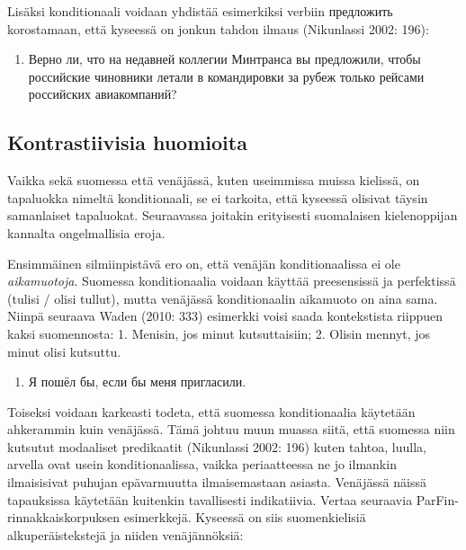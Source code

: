 \documentclass[]{scrreprt}
\providecommand{\tightlist}{%
  \setlength{\itemsep}{0pt}\setlength{\parskip}{0pt}}
\begin{document}
Lisäksi konditionaali voidaan yhdistää esimerkiksi verbiin предложить
korostamaan, että kyseessä on jonkun tahdon ilmaus (Nikunlassi 2002:
196):

\begin{enumerate}
\def\labelenumi{(\arabic{enumi})}
\setcounter{enumi}{396}
\tightlist
\item
  Верно ли, что на недавней коллегии Минтранса вы предложили, чтобы
  российские чиновники летали в командировки за рубеж только рейсами
  российских авиакомпаний?
\end{enumerate}

\subsection{Kontrastiivisia
huomioita}\label{kontrastiivisia-huomioita-1}

Vaikka sekä suomessa että venäjässä, kuten useimmissa muissa kielissä,
on tapaluokka nimeltä konditionaali, se ei tarkoita, että kyseessä
olisivat täysin samanlaiset tapaluokat. Seuraavassa joitakin erityisesti
suomalaisen kielenoppijan kannalta ongelmallisia eroja.

Ensimmäinen silmiinpistävä ero on, että venäjän konditionaalissa ei ole
\emph{aikamuotoja}. Suomessa konditionaalia voidaan käyttää preesensissä
ja perfektissä (tulisi / olisi tullut), mutta venäjässä konditionaalin
aikamuoto on aina sama. Niinpä seuraava Waden (2010: 333) esimerkki
voisi saada kontekstista riippuen kaksi suomennosta: 1. Menisin, jos
minut kutsuttaisiin; 2. Olisin mennyt, jos minut olisi kutsuttu.

\begin{enumerate}
\def\labelenumi{(\arabic{enumi})}
\setcounter{enumi}{397}
\tightlist
\item
  Я пошёл бы, если бы меня пригласили.
\end{enumerate}

Toiseksi voidaan karkeasti todeta, että suomessa konditionaalia
käytetään ahkerammin kuin venäjässä. Tämä johtuu muun muassa siitä, että
suomessa niin kutsutut modaaliset predikaatit (Nikunlassi 2002: 196)
kuten tahtoa, luulla, arvella ovat usein konditionaalissa, vaikka
periaatteessa ne jo ilmankin ilmaisisivat puhujan epävarmuutta
ilmaisemastaan asiasta. Venäjässä näissä tapauksissa käytetään kuitenkin
tavallisesti indikatiivia. Vertaa seuraavia ParFin-rinnakkaiskorpuksen
esimerkkejä. Kyseessä on siis suomenkielisiä alkuperäistekstejä ja
niiden venäjännöksiä:
\end{document}
